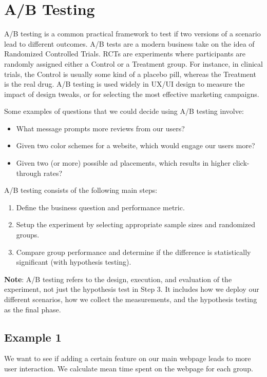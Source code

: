 \documentclass{article}
\theoremstyle{definition}
\theoremstyle{theorem}
\theoremstyle{theorem}
\theoremstyle{theorem}
\theoremstyle{theorem}
\theoremstyle{definition}
\theoremstyle{definition}
\theoremstyle{definition}
\theoremstyle{definition}
\theoremstyle{definition}
\begin{document}
\section{A/B Testing}
A/B testing is a common practical framework to test if two versions of a scenario lead to different outcomes. A/B tests are a modern business take on the idea of Randomized Controlled Trials. RCTs are experiments where participants are randomly assigned either a Control or a Treatment group. For instance, in clinical trials, the Control is usually some kind of a placebo pill, whereas the Treatment is the real drug. A/B testing is used widely in UX/UI design to measure the impact of design tweaks, or for selecting the most effective marketing campaigns.

Some examples of questions that we could decide using A/B testing involve:

\begin{itemize}
    \item What message prompts more reviews from our users?
    \item Given two color schemes for a website, which would engage our users more?
    \item Given two (or more) possible ad placements, which results in higher click-through rates?
\end{itemize}

A/B testing consists of the following main steps:

\begin{enumerate}
    \item Define the business question and performance metric.
    \item Setup the experiment by selecting appropriate sample sizes and randomized groups.
    \item Compare group performance and determine if the difference is statistically significant (with hypothesis testing).
\end{enumerate}

\textbf{Note}: A/B testing refers to the design, execution, and evaluation of the experiment, not just the hypothesis test in Step 3. It includes how we deploy our different scenarios, how we collect the measurements, and the hypothesis testing as the final phase.


\subsection*{Example 1}

We want to see if adding a certain feature on our main webpage leads to more user interaction. We calculate mean time spent on the webpage for each group.
\end{document}
